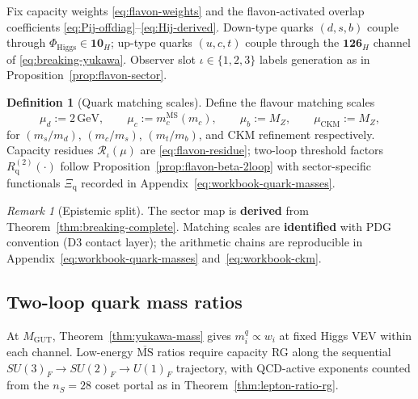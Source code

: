 \documentclass[aps,prd,onecolumn,amsmath,amssymb,nofootinbib,11pt]{revtex4-2}
\numberwithin{equation}{section}
\theoremstyle{plain}
\theoremstyle{definition}
\newtheorem{definition}[theorem]{Definition}
\theoremstyle{remark}
\newtheorem{remark}[theorem]{Remark}
\begin{document}
Fix capacity weights \eqref{eq:flavon-weights} and the flavon-activated
overlap coefficients \eqref{eq:Pij-offdiag}--\eqref{eq:Hij-derived}.
Down-type quarks $(d,s,b)$ couple through $\Phi_{\mathrm{Higgs}}\in\mathbf{10}_H$;
up-type quarks $(u,c,t)$ couple through the $\mathbf{126}_H$ channel of
\eqref{eq:breaking-yukawa}. Observer slot $\iota\in\{1,2,3\}$ labels
generation as in Proposition~\ref{prop:flavon-sector}.

\begin{definition}[Quark matching scales]\label{def:quark-matching}
Define the flavour matching scales
\begin{equation}\label{eq:quark-matching}
  \mu_d := 2\,\mathrm{GeV},
  \qquad
  \mu_c := m_c^{\overline{\mathrm{MS}}}(m_c),
  \qquad
  \mu_b := M_Z,
  \qquad
  \mu_{\mathrm{CKM}} := M_Z,
\end{equation}
for $(m_s/m_d)$, $(m_c/m_s)$, $(m_t/m_b)$, and CKM refinement respectively.
Capacity residues $\mathcal{R}_\iota(\mu)$ are \eqref{eq:flavon-residue}; two-loop
threshold factors $R_{\mathrm{q}}^{(2)}(\cdot)$ follow
Proposition~\ref{prop:flavon-beta-2loop} with sector-specific functionals
$\Xi_{\mathrm{q}}$ recorded in Appendix~\eqref{eq:workbook-quark-masses}.
\end{definition}

\begin{remark}[Epistemic split]
The sector map is \textbf{derived} from Theorem~\ref{thm:breaking-complete}.
Matching scales are \textbf{identified} with PDG convention (D3 contact layer);
the arithmetic chains are reproducible in
Appendix~\eqref{eq:workbook-quark-masses} and~\eqref{eq:workbook-ckm}.
\end{remark}

\subsection{Two-loop quark mass ratios}
\label{sec:quark-precision:masses}

At $M_{\mathrm{GUT}}$, Theorem~\ref{thm:yukawa-mass} gives
$m_i^q\propto w_i$ at fixed Higgs VEV within each channel.
Low-energy $\overline{\mathrm{MS}}$ ratios require capacity RG along the
sequential $SU(3)_F\to SU(2)_F\to U(1)_F$ trajectory, with QCD-active
exponents counted from the $n_S=28$ coset portal as in
Theorem~\ref{thm:lepton-ratio-rg}.
\end{document}
